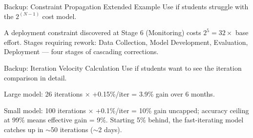 \documentclass[aspectratio=169, 12pt]{beamer}
\begin{document}
\begin{frame}{Backup: Constraint Propagation Extended Example}
\note{
%
}
\small
Use if students struggle with the $2^{(N-1)}$ cost model.

A deployment constraint discovered at Stage 6 (Monitoring) costs $2^5 = 32\times$ base effort. Stages requiring rework: Data Collection, Model Development, Evaluation, Deployment --- four stages of cascading corrections.
\end{frame}

\begin{frame}{Backup: Iteration Velocity Calculation}
\note{
%
}
\small
Use if students want to see the iteration comparison in detail.

Large model: 26 iterations $\times$ +0.15\%/iter = 3.9\% gain over 6 months.

Small model: 100 iterations $\times$ +0.1\%/iter = 10\% gain uncapped; accuracy ceiling at 99\% means effective gain = 9\%. Starting 5\% behind, the fast-iterating model catches up in $\sim$50 iterations ($\sim$2 days).
\end{frame}
\end{document}
